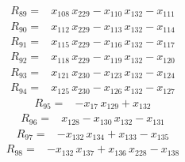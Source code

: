 \documentclass[11pt]{article}
\begin{document}
\begin{equation*}\begin{aligned}
R_{89}={}&x_{108}\,x_{229} - x_{110}\,x_{132} - x_{111}
\end{aligned}\end{equation*}
\begin{equation*}\begin{aligned}
R_{90}={}&x_{112}\,x_{229} - x_{113}\,x_{132} - x_{114}
\end{aligned}\end{equation*}
\begin{equation*}\begin{aligned}
R_{91}={}&x_{115}\,x_{229} - x_{116}\,x_{132} - x_{117}
\end{aligned}\end{equation*}
\begin{equation*}\begin{aligned}
R_{92}={}&x_{118}\,x_{229} - x_{119}\,x_{132} - x_{120}
\end{aligned}\end{equation*}
\begin{equation*}\begin{aligned}
R_{93}={}&x_{121}\,x_{230} - x_{123}\,x_{132} - x_{124}
\end{aligned}\end{equation*}
\begin{equation*}\begin{aligned}
R_{94}={}&x_{125}\,x_{230} - x_{126}\,x_{132} - x_{127}
\end{aligned}\end{equation*}
\begin{equation*}\begin{aligned}
R_{95}={}&-x_{17}\,x_{129} + x_{132}
\end{aligned}\end{equation*}
\begin{equation*}\begin{aligned}
R_{96}={}&x_{128} - x_{130}\,x_{132} - x_{131}
\end{aligned}\end{equation*}
\begin{equation*}\begin{aligned}
R_{97}={}&-x_{132}\,x_{134} + x_{133} - x_{135}
\end{aligned}\end{equation*}
\begin{equation*}\begin{aligned}
R_{98}={}&-x_{132}\,x_{137} + x_{136}\,x_{228} - x_{138}
\end{aligned}\end{equation*}
\end{document}
